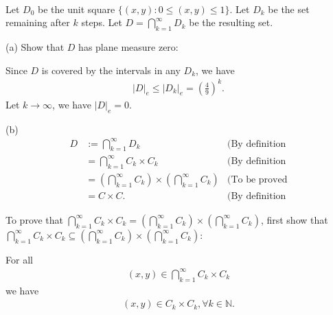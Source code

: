 \documentclass[UTF8,a4paper,10pt]{article}
\begin{document}
  \begin{solution}\,\\
    Let \(D_0\) be the unit square \(\{(x,y): 0\leq (x,y)\leq 1\}\). Let \(D_k\) be the set remaining after \(k\) steps. Let \(D = \bigcap_{k=1}^{\infty} D_k \) be the resulting set.

  

    (a) Show that \(D\) has plane measure
    zero:

    Since \(D\) is covered by the intervals in any \(D_k\), we have
    \begin{equation*}
      \begin{aligned}
        \left\lvert D\right\rvert_e \leq \left\lvert D_k \right\rvert_e = \left(\frac{4}{9}\right)^{k}.
      \end{aligned}
    \end{equation*}
    Let \(k\to\infty\), we have \(\left\lvert D\right\rvert_e = 0\).


    (b)
    \begin{equation*}
      \begin{aligned}
        D &:= \bigcap_{k=1}^{\infty} D_k &\text{(By definition}\\
        &= \bigcap_{k=1}^{\infty} C_k \times C_k &\text{(By definition}\\
        &=  \left(\bigcap_{k=1}^{\infty} C_k\right) \times \left(\bigcap_{k=1}^{\infty} C_k\right) &\text{(To be proved}\\
        &= C\times C. &\text{(By definition}
      \end{aligned}
    \end{equation*}

    To prove that \(\bigcap_{k=1}^{\infty} C_k \times C_k = \left(\bigcap_{k=1}^{\infty} C_k\right) \times \left(\bigcap_{k=1}^{\infty} C_k\right)\), first show that \(\bigcap_{k=1}^{\infty} C_k \times C_k \subseteq \left(\bigcap_{k=1}^{\infty} C_k\right) \times \left(\bigcap_{k=1}^{\infty} C_k\right)\):

For all
    \begin{equation*}
      \begin{aligned}
          (x,y)\in\bigcap_{k=1}^{\infty} C_k \times C_k
      \end{aligned}
    \end{equation*}
    we have
    \begin{equation*}
      \begin{aligned}
        (x,y)\in C_k \times C_k, \forall k \in \mathbb{N}.
      \end{aligned}
    \end{equation*}


\end{solution}
\end{document}
